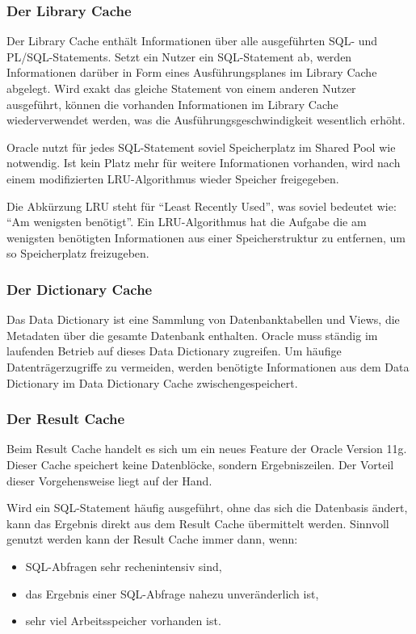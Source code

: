         \subsubsection{Der Library Cache}
          Der Library Cache enth\"alt Informationen \"uber alle ausgef\"uhrten
          SQL- und PL/SQL-Statements. Setzt ein Nutzer ein SQL-Statement ab,
          werden Informationen dar\"uber in Form eines Ausf\"uhrungsplanes im
          Library Cache abgelegt. Wird exakt das gleiche Statement von einem
          anderen Nutzer ausgef\"uhrt, k\"onnen die vorhanden Informationen im
          Library Cache wiederverwendet werden, was die
          Ausf\"uhrungsgeschwindigkeit wesentlich erh\"oht.

          Oracle nutzt f\"ur jedes SQL-Statement soviel Speicherplatz im Shared
          Pool wie notwendig. Ist kein Platz mehr f\"ur weitere Informationen
          vorhanden, wird nach einem modifizierten LRU-Algorithmus wieder
          Speicher freigegeben.

          \begin{merke}
            Die Abk\"urzung LRU steht f\"ur \enquote{Least Recently Used}, was
            soviel bedeutet wie: \enquote{Am wenigsten ben\"otigt}. Ein
            LRU-Algorithmus hat die Aufgabe die am wenigsten ben\"otigten
            Informationen aus einer Speicherstruktur zu entfernen, um so
            Speicherplatz freizugeben.
          \end{merke}
        \subsubsection{Der Dictionary Cache}
          Das Data Dictionary ist eine Sammlung von Datenbanktabellen und Views, die Metadaten \"uber die gesamte Datenbank enthalten. Oracle muss st\"andig im laufenden Betrieb auf dieses Data Dictionary zugreifen. Um h\"aufige Datentr\"agerzugriffe zu vermeiden, werden ben\"otigte Informationen aus dem Data Dictionary im Data Dictionary Cache zwischengespeichert.
        \subsubsection{Der Result Cache}
          Beim Result Cache handelt es sich um ein neues Feature der Oracle Version 11g. Dieser Cache speichert keine Datenbl\"ocke, sondern Ergebniszeilen. Der Vorteil dieser Vorgehensweise liegt auf der Hand.

          Wird ein SQL-Statement h\"aufig ausgef\"uhrt, ohne das sich die Datenbasis \"andert, kann das Ergebnis direkt aus dem Result Cache \"ubermittelt werden. Sinnvoll genutzt werden kann der Result Cache immer dann, wenn:
          \begin{itemize}
            \item SQL-Abfragen sehr rechenintensiv sind,
            \item das Ergebnis einer SQL-Abfrage nahezu unver\"anderlich ist,
            \item sehr viel Arbeitsspeicher vorhanden ist.
          \end{itemize}
